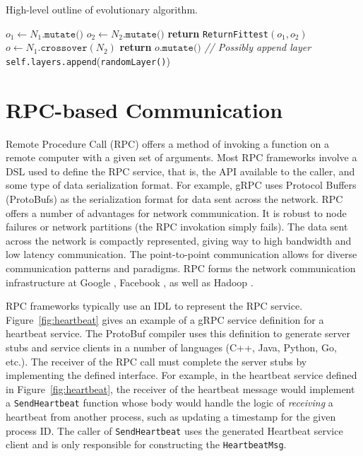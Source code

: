 \documentclass[conference]{IEEEtran}
\begin{document}
\begin{algorithm}
  \caption{High-level outline of evolutionary algorithm.}\label{alg:evo-simple}
  \begin{algorithmic}[1]
    \State $o_1\gets N_1.\texttt{mutate()}$
    \State $o_2 \gets N_2.\texttt{mutate()}$
    \State \textbf{return } \texttt{ReturnFittest}$(o_1, o_2)$
    \EndIf
    \State $o \gets N_1.\texttt{crossover}(N_2)$
    \State \textbf{return } $o.\texttt{mutate()}$
  \EndProcedure
  \State \emph{// Possibly append layer}
  \State \texttt{self.layers.append}(\texttt{randomLayer()})
  \EndIf
  \EndProcedure
  \end{algorithmic}
\end{algorithm}

\section{RPC-based Communication}
Remote Procedure Call (RPC) offers a method of invoking a function on a remote
computer with a given set of arguments. Most RPC frameworks involve a DSL used
to define the RPC service, that is, the API available to the caller, and some
type of data serialization format. For example, gRPC uses Protocol Buffers (ProtoBufs)
\cite{Varda2008} as the serialization format for data sent across the network.
RPC offers a number of advantages for network communication. It is robust to
node failures or network partitions (the RPC invokation simply fails). The data
sent across the network is compactly represented, giving way to high bandwidth
and low latency communication. The point-to-point communication allows for
diverse communication patterns and paradigms. RPC forms the network communication
infrastructure at Google \cite{van2017production}, Facebook \cite{Slee2007},
as well as Hadoop
\cite{Shvachko:2010:HDF:1913798.1914427, Lu:2013:HDH:2570457.2571128}.

RPC frameworks typically use an IDL to represent the RPC
service. Figure~\ref{fig:heartbeat} gives an example of a gRPC service
definition for a heartbeat service. The ProtoBuf compiler uses this definition
to generate server stubs and service clients in a number of languages (C++,
Java, Python, Go, etc.). The receiver of the RPC call must complete the server
stubs by implementing the defined interface. For example, in the heartbeat
service defined in Figure~\ref{fig:heartbeat}, the receiver of the heartbeat
message would implement a \texttt{SendHeartbeat} function whose body would
handle the logic of \emph{receiving} a heartbeat from another process,
such as updating a timestamp for the given process ID. The caller of
\texttt{SendHeartbeat} uses the generated Heartbeat service client and is only
responsible for constructing the \texttt{HeartbeatMsg}.
\end{document}
